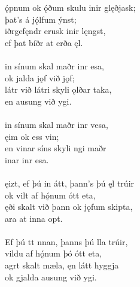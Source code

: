 \bva {}ǫ́pnum ok ǫ́ðum \hld skulu inir glęðjask; \\%
\ind þat's á jǫ́lfum ýnst; \\%
iðrgefęndr \hld erusk inir lęngst, \\%
\ind ef þat bíðr at erða ęl.\\%

 \\

\bva {}in sínum \hld skal maðr inr esa, \\%
\ind ok jalda jǫf við jǫf; \\%
látr við látri \hld skyli ǫlðar taka, \\%
\ind en ausung við ygi.\\%

 \\

\bva {}in sínum \hld skal maðr inr vesa, \\%
\ind {}ęim ok ess vin; \\%
en vinar síns \hld skyli ngi maðr \\%
\ind {}inar inr esa.\\%

 \\

\bva {}ęizt, ef þú in átt, \hld þann's þú ęl trúir \\%
\ind ok vilt af hǫ́num ótt eta, \\%
ęði skalt við þann \hld ok jǫfum skipta, \\%
\ind {}ara at inna opt.\\%

 \\

\bva Ef þú tt nnan, \hld þanns þú lla trúir, \\%
\ind vildu af hǫ́num þó ótt eta, \\%
agrt skalt mæla, \hld ęn látt hyggja \\%
\ind ok gjalda ausung við ygi.\\%

 \\

